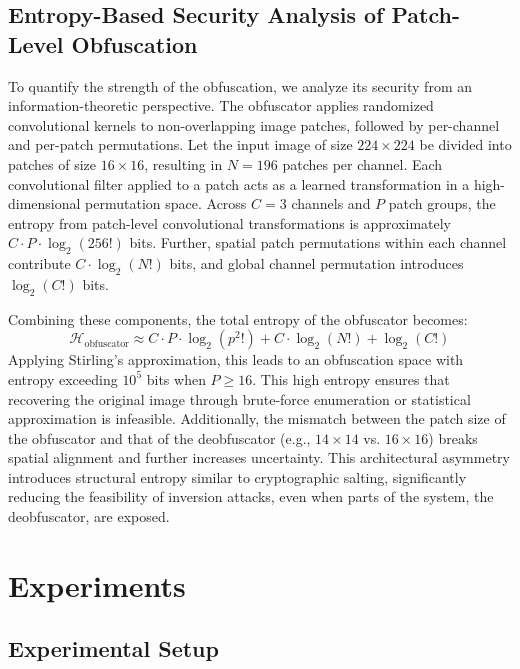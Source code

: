 \documentclass{ieeeaccess}
\begin{document}
\subsection{Entropy-Based Security Analysis of Patch-Level Obfuscation}

To quantify the strength of the obfuscation, we analyze its security from an information-theoretic perspective. The obfuscator applies randomized convolutional kernels to non-overlapping image patches, followed by per-channel and per-patch permutations. Let the input image of size $224 \times 224$ be divided into patches of size $16 \times 16$, resulting in $N = 196$ patches per channel. Each convolutional filter applied to a patch acts as a learned transformation in a high-dimensional permutation space. Across $C = 3$ channels and $P$ patch groups, the entropy from patch-level convolutional transformations is approximately $C \cdot P \cdot \log_2(256!)$ bits. Further, spatial patch permutations within each channel contribute $C \cdot \log_2(N!)$ bits, and global channel permutation introduces $\log_2(C!)$ bits.

Combining these components, the total entropy of the obfuscator becomes:
\begin{equation}
\mathcal{H}_{\text{obfuscator}} \approx C \cdot P \cdot \log_2(p^2!) + C \cdot \log_2(N!) + \log_2(C!)
\end{equation}
Applying Stirling’s approximation, this leads to an obfuscation space with entropy exceeding $10^5$ bits when $P \geq 16$. This high entropy ensures that recovering the original image through brute-force enumeration or statistical approximation is infeasible. Additionally, the mismatch between the patch size of the obfuscator and that of the deobfuscator (e.g., $14 \times 14$ vs. $16 \times 16$) breaks spatial alignment and further increases uncertainty. This architectural asymmetry introduces structural entropy similar to cryptographic salting, significantly reducing the feasibility of inversion attacks, even when parts of the system, the deobfuscator, are exposed.

\section{Experiments} \label{sec:exp}

\subsection{Experimental Setup}
\end{document}
